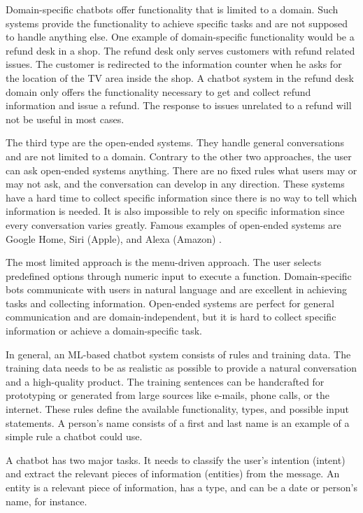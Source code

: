 Domain-specific chatbots offer functionality that is limited to a domain.
Such systems provide the functionality to achieve specific tasks and are not supposed to handle anything else.
One example of domain-specific functionality would be a refund desk in a shop.
The refund desk only serves customers with refund related issues.
The customer is redirected to the information counter when he asks for the location of the TV area inside the shop.
A chatbot system in the refund desk domain only offers the functionality necessary to get and collect refund information and issue a refund. 
The response to issues unrelated to a refund will not be useful in most cases.

The third type are the open-ended systems.
They handle general conversations and are not limited to a domain.
Contrary to the other two approaches, the user can ask open-ended systems anything. 
There are no fixed rules what users may or may not ask, and the conversation can develop in any direction.
These systems have a hard time to collect specific information since there is no way to tell which information is needed.
It is also impossible to rely on specific information since every conversation varies greatly.
Famous examples of open-ended systems are Google Home, Siri (Apple), and Alexa (Amazon) \cite{singhbuilding}.

The most limited approach is the menu-driven approach. 
The user selects predefined options through numeric input to execute a function.
Domain-specific bots communicate with users in natural language and are excellent in achieving tasks and collecting information.
Open-ended systems are perfect for general communication and are domain-independent, but it is hard to collect specific information
or achieve a domain-specific task. 

In general, an ML-based chatbot system consists of rules and training data.
The training data needs to be as realistic as possible to provide a natural conversation and a high-quality product.
The training sentences can be handcrafted for prototyping or generated from large sources like e-mails, phone calls, or the internet.
These rules define the available functionality, types, and possible input statements.
A person's name consists of a first and last name is an example of a simple rule a chatbot could use.

A chatbot has two major tasks.
It needs to classify the user's intention (intent) and extract the relevant pieces of information (entities) from the message.
An entity is a relevant piece of information, has a type, and can be a date or person's name, for instance.

